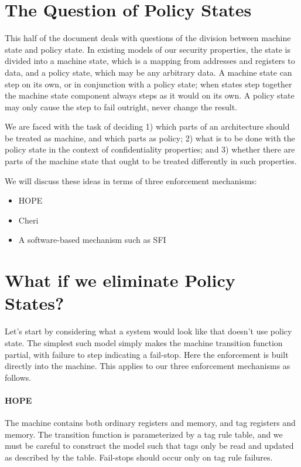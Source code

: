 \documentclass{article}
\begin{document}
\section{The Question of Policy States}

This half of the document deals with questions of the division between machine state and
policy state. In existing models of our security properties, the state is divided into a
machine state, which is a mapping from addresses and registers to data, and a policy state,
which may be any arbitrary data. A machine state can step on its own, or in conjunction
with a policy state; when states step together the machine state component always steps
as it would on its own. A policy state may only cause the step to fail outright, never
change the result.

We are faced with the task of deciding 1) which parts of an architecture should be treated
as machine, and which parts as policy; 2) what is to be done with the policy state in the
context of confidentiality properties; and 3) whether there are parts of the machine state
that ought to be treated differently in such properties.

We will discuss these ideas in terms of three enforcement mechanisms:

\begin{itemize}
\item HOPE
\item Cheri
\item A software-based mechanism such as SFI
\end{itemize}

\section{What if we eliminate Policy States?}

Let's start by considering what a system would look like that doesn't use policy state. The
simplest such model simply makes the machine transition function partial, with failure to step
indicating a fail-stop. Here the enforcement is built directly into the machine. This applies to
our three enforcement mechanisms as follows.

\paragraph*{HOPE} The machine contains both ordinary registers and memory, and tag registers
and memory. The transition function is parameterized by a tag rule table, and we must be
careful to construct the model such that tags only be read and updated as described by the
table. Fail-stops should occur only on tag rule failures.
\end{document}
